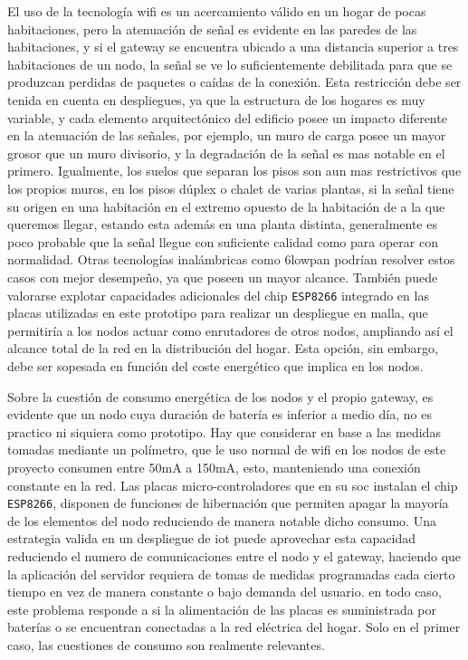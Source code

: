 El uso de la tecnología \gls{wifi} es un acercamiento válido en un hogar de pocas habitaciones, pero la atenuación de señal es evidente en las paredes de las habitaciones, y si el \gls{gateway} se encuentra ubicado a una distancia superior a tres habitaciones de un nodo, la señal se ve lo suficientemente debilitada para que se produzcan perdidas de paquetes o caídas de la conexión. Esta restricción debe ser tenida en cuenta en despliegues, ya que la estructura de los hogares es muy variable, y cada elemento arquitectónico del edificio posee un impacto diferente en la atenuación de las señales, por ejemplo, un muro de carga posee un mayor grosor que un muro divisorio, y la degradación de la señal es mas notable en el primero. Igualmente, los suelos que separan los pisos son aun mas restrictivos que los propios muros, en los pisos dúplex  o chalet de varias plantas, si la señal tiene su origen en una habitación en el extremo opuesto de la habitación de a la que queremos llegar, estando esta además en una planta distinta, generalmente es poco probable que la señal llegue con suficiente calidad como para operar con normalidad. Otras tecnologías inalámbricas como \gls{6lowpan} podrían resolver estos casos con mejor desempeño, ya que poseen un mayor alcance. También puede valorarse explotar capacidades adicionales del chip \verb|ESP8266| integrado en las placas utilizadas en este prototipo para realizar un despliegue en malla, que permitiría a los nodos actuar como enrutadores de otros nodos, ampliando así el alcance total de la red en la distribución del hogar. Esta opción, sin embargo, debe ser sopesada en función del coste energético que implica en los nodos.

\vspace{1cm}

Sobre la cuestión de consumo energética de los nodos y el propio \gls{gateway}, es evidente que un nodo cuya duración de batería es inferior a medio día, no es practico ni siquiera como prototipo. Hay que considerar en base a las medidas tomadas mediante un polímetro, que le uso normal de \gls{wifi} en los nodos de este proyecto consumen entre 50mA a 150mA, esto, manteniendo una conexión constante en la red. Las placas micro-controladores que en su \gls{soc} instalan el chip \verb|ESP8266|, disponen de funciones de hibernación que permiten apagar la mayoría de los elementos del nodo reduciendo de manera notable dicho consumo. Una estrategia valida en un despliegue de \gls{iot} puede aprovechar esta capacidad reduciendo el numero de comunicaciones entre el nodo y el \gls{gateway}, haciendo que la aplicación del servidor requiera de tomas de medidas programadas cada cierto tiempo en vez de manera constante o bajo demanda del usuario. en todo caso, este problema responde a si la alimentación de las placas es suministrada por baterías o se encuentran conectadas a la red eléctrica del hogar. Solo en el primer caso, las cuestiones de consumo son realmente relevantes.

